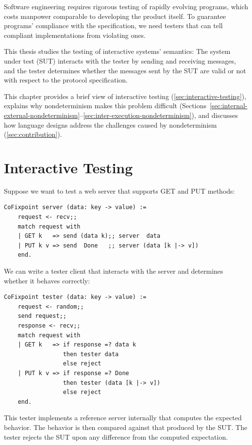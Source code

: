 Software engineering requires rigorous testing of rapidly evolving programs,
which costs manpower comparable to developing the product itself.  To guarantee
programs' compliance with the specification, we need testers that can tell
compliant implementations from violating ones.

This thesis studies the testing of interactive systems' semantics: The system
under test (SUT) interacts with the tester by sending and receiving messages,
and the tester determines whether the messages sent by the SUT are valid or not
with respect to the protocol specification.

This chapter provides a brief view of interactive testing
(\autoref{sec:interactive-testing}), explains why nondeterminism makes this
problem difficult
(Sections~\ref{sec:internal-external-nondeterminism}--\ref{sec:inter-execution-nondeterminism}),
and discusses how language designs address the challenges caused by
nondeterminism (\autoref{sec:contribution}).

\section{Interactive Testing}
\label{sec:interactive-testing}
Suppose we want to test a web server that supports GET and PUT methods:
\begin{lstlisting}[style=customcoq]
  CoFixpoint server (data: key -> value) :=
    request <- recv;;
    match request with
    | GET k   => send (data k);; server  data
    | PUT k v => send  Done   ;; server (data [k |-> v])
    end.
\end{lstlisting}
We can write a tester client that interacts with the server and determines
whether it behaves correctly:
\begin{lstlisting}[style=customcoq]
  CoFixpoint tester (data: key -> value) :=
    request <- random;;
    send request;;
    response <- recv;;
    match request with
    | GET k   => if response =? data k
                 then tester data
                 else reject
    | PUT k v => if response =? Done
                 then tester (data [k |-> v])
                 else reject
    end.
\end{lstlisting}
This tester implements a reference server internally that computes the expected
behavior.  The behavior is then compared against that produced by the SUT.  The
tester rejects the SUT upon any difference from the computed expectation.

